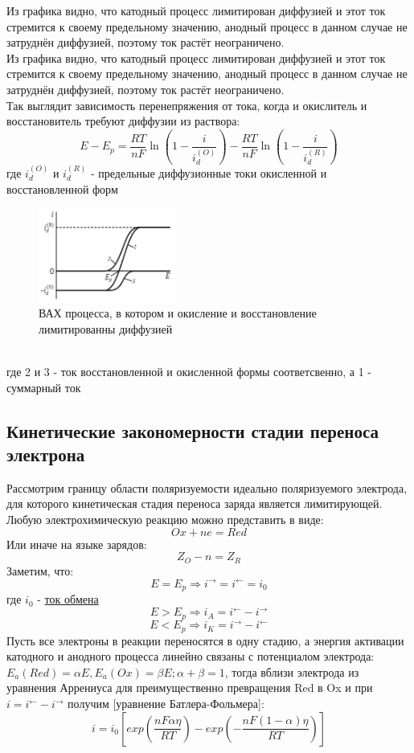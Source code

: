 \documentclass[a4paper,12pt]{article}
\begin{document}
Из графика видно, что катодный процесс лимитирован диффузией и этот ток стремится к своему предельному значению, анодный процесс в данном случае не затруднён диффузией, поэтому ток растёт неограничено.\\


Из графика видно, что катодный процесс лимитирован диффузией и этот ток стремится к своему предельному значению, анодный процесс в данном случае не затруднён диффузией, поэтому ток растёт неограничено.\\

Так выглядит зависимость перенепряжения от тока, когда и окислитель и восстановитель требуют диффузии из раствора:
\[ E - E_p = \frac{RT}{nF}\ln{(1 - \frac{i}{i_d^{(O)}})} - \frac{RT}{nF}\ln{(1 - \frac{i}{i_d^{(R)}})} \]
где $i_d^{(O)}$ и $i_d^{(R)}$ - предельные диффузионные токи окисленной и восстановленной форм

\begin{figure}[h!]
    \centering
    \includegraphics[width = 0.4\textwidth]{ВАХ_к_а.png}
    \caption{ВАХ процесса, в котором и окисление и восстановление лимитированны диффузией}
    \label{fig:no_int}
\end{figure}\\

где 2 и 3 - ток восстановленной и окисленной формы соответсвенно, а 1 - суммарный ток\\

\subsection{Кинетические закономерности стадии переноса электрона}
    
Рассмотрим границу области поляризуемости идеально поляризуемого электрода, для которого кинетическая стадия переноса заряда является лимитирующей.\\

Любую электрохимическую реакцию можно представить в виде:
\[ Ox + ne = Red \]
Или иначе на языке зарядов:
\[ Z_O - n = Z_R \]
Заметим, что:
\[ E = E_p \Rightarrow i^{\to} = i^{\leftarrow} = i_0 \] где $i_0$ - \underline{ток обмена}
\[ E > E_p \Rightarrow i_A = i^{\leftarrow} - i^{\to} \]
\[ E < E_p \Rightarrow i_K = i^{\to} - i^{\leftarrow} \]
Пусть все электроны в реакции переносятся в одну стадию, а энергия активации катодного и анодного процесса линейно связаны с потенциалом электрода: $E_a(Red) = \alpha{E}, E_a(Ox) = \beta{E}; \alpha + \beta = 1$, тогда вблизи электрода из уравнения Аррениуса для преимущественно превращения Red в Ox и при $i = i^{\leftarrow} - i^{\to}$ получим [уравнение Батлера-Фольмера]:
\[ i = i_0[exp(\frac{nF\alpha\eta}{RT}) - exp(-\frac{nF(1 - \alpha)\eta}{RT})] \]
\end{document}

